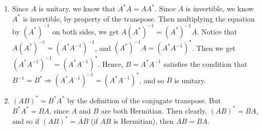 \documentclass[10pt,english]{article}
\begin{document}
\begin{enumerate}
\pagebreak
\item Since $A$ is unitary, we know that $A^*A=AA^*$. Since $A$ is invertible, we know $A^*$ is invertible, by property of the transpose. Then multiplying the equation by $(A^*)^{-1}$ on both sides, we get $A(A^{*})^{-1}=(A^{*})^{-1}A$. Notice that $A(A^*)^{-1}=(A^*A^{-1})^{-1}$, and $(A^*)^{-1}A=(A^*A^{-1})^*$. Then we get $(A^*A^{-1})^{-1}=(A^*A^{-1})^*$. Hence, $B=A^*A^{-1}$ satisfies the condition that $B^{-1}=B^* \Rightarrow (A^*A^{-1})^{-1}=(A^*A^{-1})^*$, and so $B$ is unitary. 

\pagebreak
\item $(AB)^*=B^*A^*$ by the definition of the conjugate transpose. But $B^*A^*=BA$, since $A$ and $B$ are both Hermitian. Then clearly, $(AB)^*=BA$, and so if $(AB)^*=AB$ (if $AB$ is Hermitian), then $AB=BA$. 


\end{enumerate}
\end{document}
